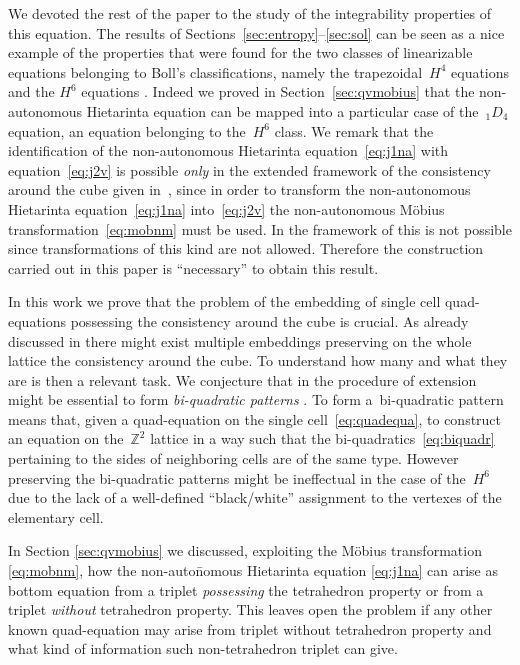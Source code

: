 \documentclass[pdftex]{sigma}
\numberwithin{equation}{section}
\newcommand{\Z}{\mathbb{Z}}
\begin{document}
We devoted the rest of the paper to the study of the integrability properties of this equation.
The results of Sections~\ref{sec:entropy}--\ref{sec:sol}
can be seen as a nice example of the properties that were
found for the two classes of linearizable equations belonging
to Boll's classif\/ications, namely the trapezoidal~$H^{4}$
equations and the $H^{6}$ equations \cite{GSL_general,GSL_Gallipoli15,GSL_Pavel,GSL_symmetries,GSL_QV,GSY_DarbouxII,
GSY_DarbouxI}.
Indeed we proved in Section~\ref{sec:qvmobius} that the
non-autonomous Hietarinta equation can be mapped into a
particular case of the~$_{1}D_{4}$ equation, an equation
belonging to the~$H^{6}$ class.
We remark that the identif\/ication of the non-autonomous
Hietarinta equation~\eqref{eq:j1na} with equation~\eqref{eq:j2v}
is possible \emph{only} in the extended framework of
the consistency around the cube given in~\cite{ABS2009,Boll2011,Boll2012a,Boll2012b},
since in order to transform the non-autonomous
Hietarinta equation~\eqref{eq:j1na} into~\eqref{eq:j2v}
the non-autonomous M\"obius transformation~\eqref{eq:mobnm}
must be used.
In the framework of \cite{ABS2003} this is not possible
since transformations of this kind are not allowed.
Therefore the construction carried out in this paper
is ``necessary'' to obtain this result.

In this work we prove that the problem of the embedding
of single cell quad-equations possessing the
consistency around the cube is crucial.
As already discussed in \cite{HietarintaViallet2012} there might
exist multiple embeddings preserving on the whole
lattice the consistency around the cube.
To understand how many and what they are is then a relevant task.
We conjecture that in the procedure of extension might
be essential to form \emph{bi-quadratic patterns}
\cite{Boll2011,Boll2012a,Boll2012b}.
To form a~bi-quadratic pattern means that, given a quad-equation
on the single cell~\eqref{eq:quadequa}, to construct an equation
on the~$\Z^{2}$ lattice in a way such that
the bi-quadratics~\eqref{eq:biquadr} pertaining to the sides
of neighboring cells are of the same type.
However preserving the bi-quadratic patterns might be inef\/fectual
in the case of the~$H^{6}$ due to the lack of a well-def\/ined
``black/white'' assignment to the vertexes of the elementary cell.

In Section \ref{sec:qvmobius} we discussed, exploiting the
M\"obius transformation \eqref{eq:mobnm}, how the non-auto\=no\-mous
Hietarinta equation \eqref{eq:j1na} can arise as bottom equation
from a triplet \emph{possessing} the tetrahedron property
or from a triplet \emph{without} tetrahedron property.
This leaves open the problem if any other known quad-equation
may arise from triplet without tetrahedron property
and what kind of information such non-tetrahedron triplet can give.
\end{document}
